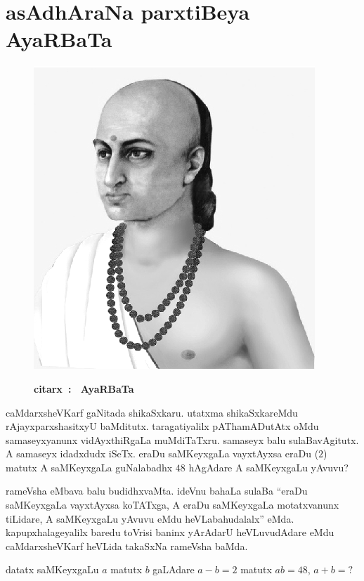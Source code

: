 \chapter{asAdhAraNa parxtiBeya AyaRBaTa}


\begin{figure}
  \centering\includegraphics[scale=0.8]{src/figures/aryabhata.eps}
  
  {\bf citarx~: ~AyaRBaTa}
    \end{figure}
    
caMdarxsheVKarf gaNitada shikaSxkaru. utatxma shikaSxkareMdu rAjayxparxshasitxyU baMditutx. taragati\-yalilx pAThamADutAtx oMdu samaseyxyanunx vidAyxthiRgaLa muMdiTaTxru. samaseyx balu sulaBavAgitutx. A samaseyx idadxdudx iSeTx. eraDu saMKeyxgaLa vayxtAyxsa eraDu ($2$) matutx A saMKeyxgaLa guNalabadhx $48$ hAgAdare A saMKeyxgaLu yAvuvu?

rameVsha eMbava balu budidhxvaMta. ideVnu bahaLa sulaBa ``eraDu saMKeyxgaLa vayxtAyxsa koTATxga, A eraDu saMKeyxgaLa motatxvanunx tiLidare, A saMKeyxgaLu yAvuvu eMdu heVLabahudalalx'' eMda. kapupxhalageyalilx baredu toVrisi baninx yArAdarU heVLuvudAdare eMdu caMdarxsheVKarf heVLida takaSxNa rameVsha baMda.

datatx saMKeyxgaLu $a$ matutx $b$ gaLAdare $a-b=2$ matutx $ab = 48$, $a+b=?$

